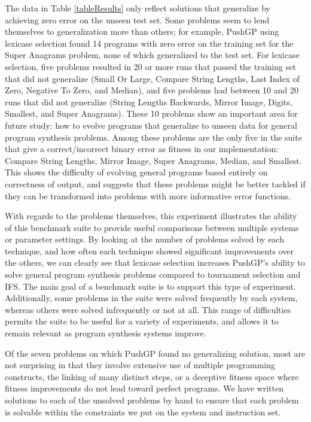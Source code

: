 \documentclass{sig-alternate}
\begin{document}
The data in Table \ref{tableResults} only reflect solutions that generalize by achieving zero error on the unseen test set. Some problems seem to lend themselves to generalization more than others; for example, PushGP using lexicase selection found 14 programs with zero error on the training set for the Super Anagrams problem, none of which generalized to the test set. For lexicase selection, five problems resulted in 20 or more runs that passed the training set that did not generalize (Small Or Large,
Compare String Lengths,
Last Index of Zero,
Negative To Zero, and
Median),
and five problems had between 10 and 20 runs that did not generalize (String Lengths Backwards,
Mirror Image,
Digits,
Smallest, and
Super Anagrams).
These 10 problems show an important area for future study: how to evolve programs that generalize to unseen data for general program synthesis problems. Among these problems are the only five in the suite that give a correct/incorrect binary error as fitness in our implementation: Compare String Lengths, Mirror Image, Super Anagrams, Median, and Smallest. This shows the difficulty of evolving general programs based entirely on correctness of output, and suggests that these problems might be better tackled if they can be transformed into problems with more informative error functions.

%

With regards to the problems themselves, this experiment illustrates the ability of this benchmark suite to provide useful comparisons between multiple systems or parameter settings. By looking at the number of problems solved by each technique, and how often each technique showed significant improvements over the others, we can clearly see that lexicase selection increases PushGP's ability to solve general program synthesis problems compared to tournament selection and IFS. The main goal of a benchmark suite is to support this type of experiment. Additionally, some problems in the suite were solved frequently by each system, whereas others were solved infrequently or not at all. This range of difficulties permits the suite to be useful for a variety of experiments, and allows it to remain relevant as program synthesis systems improve.

Of the seven problems on which PushGP found no generalizing solution, most are not surprising in that they involve extensive use of multiple programming constructs, the linking of many distinct steps, or a deceptive fitness space where fitness improvements do not lead toward perfect programs. 
We have written solutions to each of the unsolved problems by hand to ensure that each problem is solvable within the constraints we put on the system and instruction set.
\end{document}
